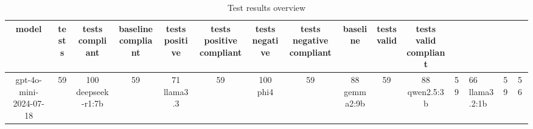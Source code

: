 
  \begin{table}[h!]
  \centering
  \begin{tabular}{|c|c|c|c|c|c|c|c|c|c|c|}
  \hline
  model & tests & tests compliant & baseline compliant & tests positive & tests positive compliant & tests negative & tests negative compliant & baseline & tests valid & tests valid compliant \\
  \hline
  gpt-4o-mini-2024-07-18 & 59 & 100%
\hline
deepseek-r1:7b & 59 & 71%
\hline
llama3.3 & 59 & 100%
\hline
phi4 & 59 & 88%
\hline
gemma2:9b & 59 & 88%
\hline
qwen2.5:3b & 59 & 66%
\hline
llama3.2:1b & 59 & 56%
  \end{tabular}
  \caption{Test results overview}
  
  \end{table}
  